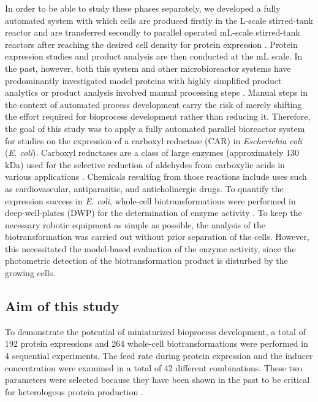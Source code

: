 \documentclass[sn-standardnature]{sn-jnl}%
\theoremstyle{thmstyleone}%
\theoremstyle{thmstyletwo}%
\theoremstyle{thmstylethree}%
\begin{document}
In order to be able to study these phases separately, we developed a fully automated system with which cells are produced firstly in the L-scale stirred-tank reactor and are transferred secondly to parallel operated mL-scale stirred-tank reactors after reaching the desired cell density for protein expression \cite{von2021automated}.
Protein expression studies and product analysis are then conducted at the mL scale.
In the past, however, both this system and other microbioreactor systems have predominantly investigated model proteins with highly simplified product analytics \cite{schmideder2017high,von2021automated,huber2009robo} or product analysis involved manual processing steps \cite{haby2019integrated}.
Manual steps in the context of automated process development carry the risk of merely shifting the effort required for bioprocess development rather than reducing it.
Therefore, the goal of this study was to apply a fully automated parallel bioreactor system for studies on the expression of a carboxyl reductase (CAR) in \textit{Escherichia coli} (\textit{E. coli}).
Carboxyl reductases are a class of large enzymes (approximately 130 kDa) used for the selective reduction of aldehydes from carboxylic acids in various applications \cite{weber2021production}.
Chemicals resulting from those reactions include uses such as cardiovascular, antiparasitic, and anticholinergic drugs\cite{erdmann2017enzymatic,weber2021production,ruff2012biocatalytic}.
To quantify the expression success in \textit{E. coli}, whole-cell biotransformations were performed in deep-well-plates (DWP) for the determination of enzyme activity \cite{schwendenwein2019random}.
To keep the necessary robotic equipment as simple as possible, the analysis of the biotransformation was carried out without prior separation of the cells.
However, this necessitated the model-based evaluation of the enzyme activity, since the photometric detection of the biotransformation product is disturbed by the growing cells.

\subsection{Aim of this study}
\label{sec_intro_aim}

To demonstrate the potential of miniaturized bioprocess development, a total of 192 protein expressions and 264 whole-cell biotransformations were performed in 4 sequential experiments.
The feed rate during protein expression and the inducer concentration were examined in a total of 42 different combinations.
These two parameters were selected because they have been shown in the past to be critical for heterologous protein production \cite{neubauer2001expression,von2021automated}.
\end{document}
